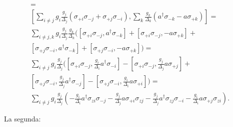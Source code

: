 \begin{multline}
[\sum\limits_{ij} g_i \frac{g_j}{\Delta_j} \left(\sigma_{+i} \sigma_{-j} + \sigma_{+j} \sigma_{-i}\right), \sum\limits_k \frac{g_k} {\Delta_k} (a^\dagger \sigma_{-k} - a \sigma_{+k})] = \\
[\sum\limits_{i \neq j} g_i \frac{g_j}{\Delta_j} \left(\sigma_{+i} \sigma_{-j} + \sigma_{+j} \sigma_{-i}\right), \sum\limits_k \frac{g_k} {\Delta_k} (a^\dagger \sigma_{-k} - a \sigma_{+k})] = \\
\sum\limits_{i \neq j, k} g_i \frac{g_j}{\Delta_j} \frac{g_k}{\Delta_k} (
[\sigma_{+i} \sigma_{-j},  a^\dagger \sigma_{-k}] +
[\sigma_{+i} \sigma_{-j},  - a \sigma_{+k}] + \\
[\sigma_{+j} \sigma_{-i},  a^\dagger \sigma_{-k}] +
[\sigma_{+j} \sigma_{-i}, - a \sigma_{+k}] ) = \\
\sum\limits_{i \neq j} g_i \frac{g_j}{\Delta_j} (
[\sigma_{+i} \sigma_{-j}, \frac{g_i}{\Delta_i}  a^\dagger \sigma_{-i}] -
[\sigma_{+i} \sigma_{-j}, \frac{g_j}{\Delta_j} a \sigma_{+j}] + \\
[\sigma_{+j} \sigma_{-i}, \frac{g_j}{\Delta_j} a^\dagger \sigma_{-j}] -
[\sigma_{+j} \sigma_{-i}, \frac{g_i}{\Delta_i} a \sigma_{+i}] ) = \\
\sum\limits_{i \neq j} g_i \frac{g_j}{\Delta_j} \left(
- \frac{g_i}{\Delta_i} a^\dagger \sigma_{zi} \sigma_{-j}
- \frac{g_j}{\Delta_j} a \sigma_{+i} \sigma_{zj}
- \frac{g_j}{\Delta_j} a^\dagger \sigma_{zj} \sigma_{-i}
- \frac{g_i}{\Delta_i} a \sigma_{+j} \sigma_{zi} \right) .
\end{multline}

La segunda:

